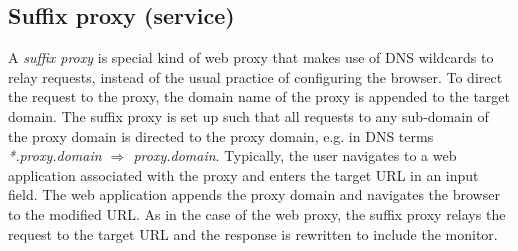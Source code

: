 \documentclass{llncs}
\newcommand{\todo}[1]{\colorbox{red}{\textcolor{white}{\sffamily\bfseries\scriptsize TODO}} \textcolor{red}{#1} \textcolor{red}{$\blacktriangleleft$}}
\begin{document}
\subsection{Suffix proxy (service)}


A \emph{suffix proxy} is special kind of web proxy that makes use of DNS wildcards to 
relay requests, instead of the usual practice of configuring the browser.
To direct the request to the proxy, the domain name of the 
proxy is appended to the target domain. The suffix proxy is set up such
that all requests to any sub-domain of the proxy domain is directed to the proxy domain, 
e.g. in DNS terms \emph{*.proxy.domain $\Rightarrow$ proxy.domain}. Typically, the user navigates to a 
web application associated with the proxy and enters the target URL in 
an input field. The web application appends the proxy domain and navigates the 
browser to the modified URL. As in the case of the web proxy, the suffix proxy 
relays the request to the target URL and the response is rewritten to include 
the monitor.
\end{document}
